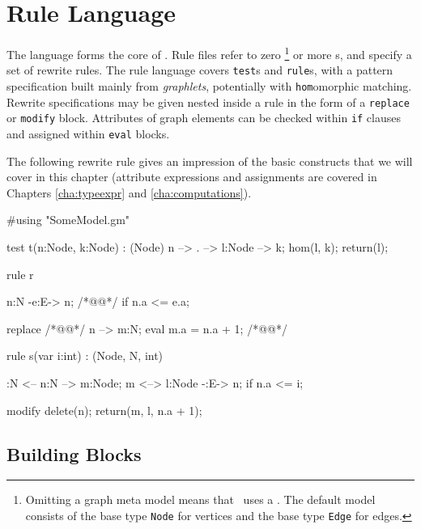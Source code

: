 \chapter{Rule Language}
\label{chaprulelang}

The  language forms the core of \GrG.
Rule files refer to zero
\footnote{Omitting a graph meta model means that \GrG\ uses a .
The default model consists of the base type \texttt{Node} for vertices and the base type \texttt{Edge} for edges.}
or more s, and specify a set of rewrite rules.
The rule language covers \texttt{test}s and \texttt{rule}s, with a pattern specification built mainly from \emph{graphlets}, potentially with \texttt{hom}omorphic matching.
Rewrite specifications may be given nested inside a rule in the form of a \texttt{replace} or \texttt{modify} block.
Attributes of graph elements can be checked within \texttt{if} clauses and assigned within \texttt{eval} blocks.

The following rewrite rule gives an impression of the basic constructs that we will cover in this chapter (attribute expressions and assignments are covered in Chapters \ref{cha:typeexpr} and \ref{cha:computations}).

\begin{example}\label{ex:rule:SomeSimplifiedRule}
\begin{grgen}
#using "SomeModel.gm"

test t(n:Node, k:Node) : (Node) {
    n --> . --> l:Node --> k;
    hom(l, k);
    return(l);
}

rule r {
    n:N -e:E-> n; /*@\label{ex:somerule:graphlet}@*/
    if{ n.a <= e.a; }

    replace { /*@\label{ex:somerule:scope:begin}@*/
        n --> m:N; 
        eval { m.a = n.a + 1; }
    } /*@\label{ex:somerule:scope:end}@*/
}

rule s(var i:int) : (Node, N, int) {
    :N <-- n:N --> m:Node;
    m <--> l:Node -:E-> n;
    if{ n.a <= i; }

    modify {
        delete(n);
        return(m, l, n.a + 1);
    }
}
\end{grgen}
\end{example}

\section{Building Blocks}
\label{rulebb}

